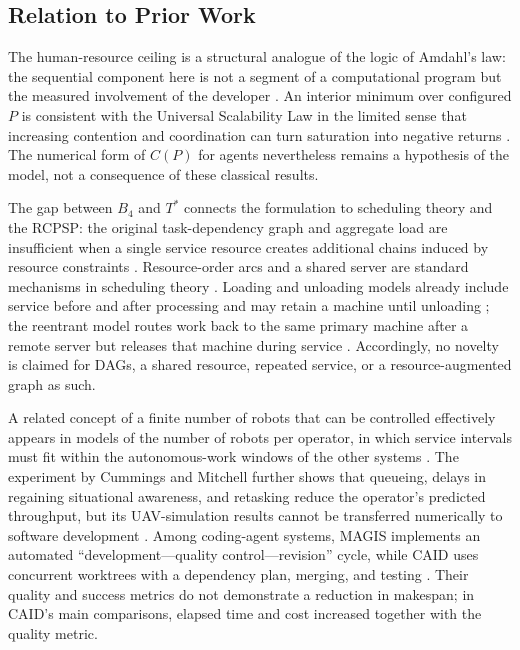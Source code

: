 \subsection{Relation to Prior Work}

The human-resource ceiling is a structural analogue of the logic of Amdahl's
law: the sequential component here is not a segment of a computational program
but the measured involvement of the developer \cite{amdahl1967validity}. An
interior
minimum over configured $P$ is consistent with the Universal Scalability Law in
the limited sense that increasing contention and coordination can turn
saturation into negative returns \cite{gunther2008general}. The numerical form
of $C(P)$ for agents nevertheless remains a hypothesis of the model, not a
consequence of these classical results.

The gap between $B_4$ and $T^*$ connects the formulation to scheduling theory
and the RCPSP: the original task-dependency graph and aggregate load are
insufficient when a single service resource creates additional chains induced
by resource constraints \cite{graham1966bounds,brucker1999resource}.
Resource-order arcs and a shared server are standard mechanisms in scheduling
theory \cite{pinedo2008scheduling,hall2000parallel}. Loading and unloading models
already include service before and after processing and may retain a machine
until unloading \cite{elidrissi2023loading}; the reentrant model routes work back
to the same primary machine after a remote server but releases that machine
during service \cite{chakhlevitch2009reentrant}. Accordingly, no novelty is
claimed for DAGs, a shared resource, repeated service, or a resource-augmented
graph as such.

A related concept of a finite number of robots that can be controlled
effectively appears in models of the number of robots per operator, in which
service intervals must fit within the autonomous-work windows of the other
systems \cite{olsen2004fanout,crandall2005validating}. The experiment by Cummings
and Mitchell further shows that queueing, delays in regaining situational
awareness, and retasking reduce the operator's predicted throughput, but its
UAV-simulation results cannot be transferred numerically to software development
\cite{cummings2008predicting}. Among coding-agent systems, MAGIS implements an
automated ``development---quality control---revision'' cycle, while CAID uses
concurrent worktrees with a dependency plan, merging, and testing
\cite{tao2024magis,geng2026caid}. Their quality and success metrics do not
demonstrate a reduction in makespan; in CAID's main comparisons, elapsed time
and cost increased together with the quality metric.

